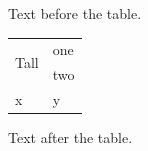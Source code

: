 \documentclass[12pt]{article}
\begin{document}
Text before the table.

\begin{tabular}{|l|l|}\hline \multirow{2}{*}{Tall} & one\\ & two\\\hline x & y\\\hline\end{tabular}

Text after the table.
\end{document}
